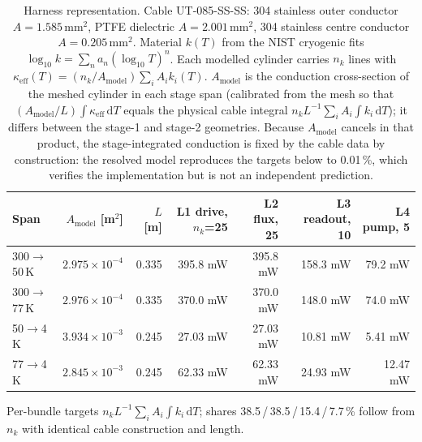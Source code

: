 \documentclass[11pt]{article}
\begin{document}
\begin{table}[H]\centering\small
\caption{Harness representation. Cable UT-085-SS-SS: 304 stainless outer conductor
$A=1.585$\,mm$^2$, PTFE dielectric $A=2.001$\,mm$^2$, 304 stainless centre conductor
$A=0.205$\,mm$^2$. Material $k(T)$ from the NIST cryogenic fits
$\log_{10}k=\sum_n a_n(\log_{10}T)^n$. Each modelled cylinder carries $n_k$ lines with
$\kappa_{\mathrm{eff}}(T)=(n_k/A_{\mathrm{model}})\sum_iA_ik_i(T)$. $A_{\mathrm{model}}$ is the
conduction cross-section of the meshed cylinder in each stage span (calibrated from the mesh so
that $(A_{\mathrm{model}}/L)\int\kappa_{\mathrm{eff}}\,\mathrm dT$ equals the physical cable
integral $n_kL^{-1}\sum_iA_i\int k_i\,\mathrm dT$); it differs between the stage-1 and stage-2
geometries. Because $A_{\mathrm{model}}$ cancels in that product, the stage-integrated
conduction is fixed by the cable data by construction: the resolved model reproduces the
targets below to 0.01\,\%, which verifies the implementation but is not an independent
prediction.}
\setlength{\tabcolsep}{4pt}
\begin{tabular}{l r r r r r r}
\toprule
Span & $A_{\mathrm{model}}$ [m$^2$] & $L$ [m] & L1 drive, $n_k$=25 & L2 flux, 25 & L3 readout, 10 & L4 pump, 5 \\
\midrule
300$\to$50\,K & $2.975\times10^{-4}$ & 0.335 & 395.8 mW & 395.8 mW & 158.3 mW & 79.2 mW \\
300$\to$77\,K & $2.976\times10^{-4}$ & 0.335 & 370.0 mW & 370.0 mW & 148.0 mW & 74.0 mW \\
50$\to$4\,K & $3.934\times10^{-3}$ & 0.245 & 27.03 mW & 27.03 mW & 10.81 mW & 5.41 mW \\
77$\to$4\,K & $2.845\times10^{-3}$ & 0.245 & 62.33 mW & 62.33 mW & 24.93 mW & 12.47 mW \\
\bottomrule
\end{tabular}
\par\smallskip\footnotesize Per-bundle targets $n_kL^{-1}\sum_iA_i\int k_i\,\mathrm dT$; shares
38.5\,/\,38.5\,/\,15.4\,/\,7.7\,\% follow from $n_k$ with identical cable construction and length.
\end{table}
\end{document}
